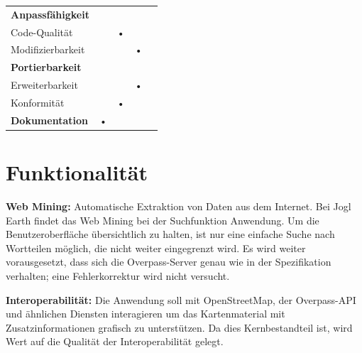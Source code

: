 \documentclass[10pt]{scrreprt}
\newenvironment{indents}{%
  \parskip6pt \parindent5mm \raggedright%
  \def\item{\hangindent=5mm \hangafter1}}{%
  \par\ignorespaces}
\begin{document}
\begin{center}
\begin{tabular}{lcccc}
\hline 
\rule[-1ex]{0pt}{4ex} \textbf{Anpassfähigkeit} &  &  &  &  \\ 
\rule[-1ex]{0pt}{4ex} \hspace{10pt} Code-Qualität & & • & & \\ 
\rule[-1ex]{0pt}{4ex} \hspace{10pt} Modifizierbarkeit & & & • & \\ 

\hline 
\rule[-1ex]{0pt}{4ex} \textbf{Portierbarkeit} &  &  &  &  \\ 
\rule[-1ex]{0pt}{4ex} \hspace{10pt} Erweiterbarkeit & & & • & \\ 
\rule[-1ex]{0pt}{4ex} \hspace{10pt} Konformität & & • & & \\ 

\hline 
\rule[-1ex]{0pt}{4ex} \textbf{Dokumentation} & • & & & \\ 
\hline 
\end{tabular} 
\end{center}

\pagebreak



\section*{Funktionalität}
\begin{indents}
\item \textbf{Web Mining:} Automatische Extraktion von Daten aus dem Internet. Bei Jogl Earth findet das Web Mining bei der Suchfunktion Anwendung. Um die Benutzeroberfläche übersichtlich zu halten, ist nur eine einfache Suche nach Wortteilen möglich, die nicht weiter eingegrenzt wird. Es wird weiter vorausgesetzt, dass sich die Overpass-Server genau wie in der Spezifikation verhalten; eine Fehlerkorrektur wird nicht versucht.

\item \textbf{Interoperabilität:} Die Anwendung soll mit OpenStreetMap, der Overpass-API und ähnlichen Diensten interagieren um das Kartenmaterial mit Zusatzinformationen grafisch zu unterstützen. Da dies Kernbestandteil ist, wird Wert auf die Qualität der Interoperabilität gelegt.
\end{indents}
\end{document}
